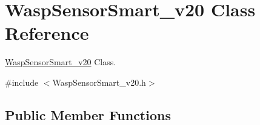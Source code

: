 \hypertarget{class_wasp_sensor_smart__v20}{}\section{Wasp\+Sensor\+Smart\+\_\+v20 Class Reference}
\label{class_wasp_sensor_smart__v20}


\hyperlink{class_wasp_sensor_smart__v20}{Wasp\+Sensor\+Smart\+\_\+v20} Class.  




{\ttfamily \#include $<$Wasp\+Sensor\+Smart\+\_\+v20.\+h$>$}

\subsection*{Public Member Functions}
